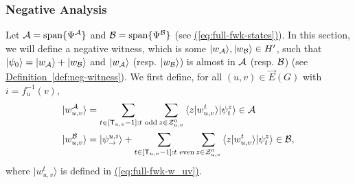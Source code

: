 \documentclass{article}
\newcommand{\eq}[1]{\hyperref[eq:#1]{(\ref*{eq:#1})}}
\newcommand{\defin}[1]{\hyperref[def:#1]{Definition~\ref*{def:#1}}}
\def\ket#1{{\lvert}#1\rangle}
\renewcommand{\>}{\rangle}
\newcommand{\<}{\langle}
\renewcommand{\(}{\left(}
\renewcommand{\)}{\right)}
\def\braket#1#2{{{\langle}#1\vert}#2\rangle}
\begin{document}
\subsubsection{Negative Analysis} 

Let ${\cal A}=\mathrm{span}\{\Psi^{\cal A}\}$ and ${\cal B}=\mathrm{span}\{\Psi^{\cal B}\}$ (see \eq{full-fwk-states}).
In this section, we will define a negative witness, which is some $\ket{w_{\cal A}},\ket{w_{\cal B}}\in H'$, such that $\ket{\psi_0}=\ket{w_{\cal A}}+\ket{w_{\cal B}}$ and $\ket{w_{\cal A}}$ (resp. $\ket{w_{\cal B}}$) is almost in ${\cal A}$ (resp. ${\cal B}$) (see \defin{neg-witness}). 
We first define, for all $(u,v)\in\overrightarrow{E}(G)$ with $i=f_u^{-1}(v)$, 
\begin{equation}
\begin{split}
\ket{w_{u,v}^{\cal A}} &= \sum_{t\in [{\sf T}_{u,v}-1]:t\text{ odd}}\sum_{z\in {\cal Z}_{u,v}^0}\braket{z}{w_{u,v}^t}\ket{\psi_t^{z}}\in{\cal A}\\
\ket{w_{u,v}^{\cal B}} &= \ket{\psi_{\rightarrow}^{u,i}}+\sum_{t\in [{\sf T}_{u,v}-1]:t\text{ even}}\sum_{z\in {\cal Z}_{u,v}^0}\braket{z}{w_{u,v}^t}\ket{\psi_t^{z}}\in{\cal B},
\end{split}\label{eq:w_uv-AB}
\end{equation}
where $\ket{w_{u,v}^t}$ is defined in \eq{full-fwk-w_uv}.
\end{document}
